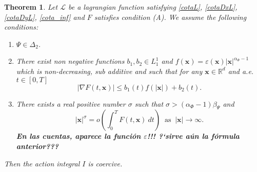 \documentclass[twoside]{article}
\newtheorem{thm}{Theorem}[section]
\theoremstyle{remark}
\renewcommand{\b}[1]{\boldsymbol{#1}}
\newcommand{\rr}{\mathbb{R}}
\renewcommand{\leq}{\leqslant}
\begin{document}
\begin{thm}\label{coercitividad-r}
Let  $\mathcal{L}$ be a lagrangian function satisfying \eqref{cotaL}, \eqref{cotaDxL}, \eqref{cotaDyL}, \eqref{cota_inf}  and $F$ satisfies condition (A). We assume the following conditions:
\begin{enumerate}
\item $\Psi\in\Delta_2$.
\item There exist  non negative functions  $b_1,b_2 \in L^1_1$ and 
$f(\b{x})=\varepsilon(\b{x})|\b{x}|^{\alpha_{\Phi}-1}$ which is  non-decreasing, sub additive and  such that
for any $\b{x}\in\rr^d$ and a.e. $t\in [0,T]$
\begin{equation}\label{holder_cont-mu}
  \left| \nabla F(t,\b{x}) \right|\leq b_1(t)f(|\b{x}|)+b_2(t).
\end{equation}
\item There exists a real positive number $\sigma$ such that $\sigma>(\alpha_{\Phi}-1)\beta_{\Psi}$ and
\begin{equation}\label{propiedad-coercividad-sigma}
|\b{x}|^{\sigma}=o\left(\int_{0}^{T}F(t,\b{x})\ dt\right)\;\;\mbox{as}\;\;|\b{x}|\to \infty.
\end{equation}
{\bf En las cuentas, aparece la funci\'on $\varepsilon$!!! 
?`sirve a\'un la f\'ormula anterior???}
\end{enumerate}
Then  the action integral $I$ is coercive.
\end{thm}
\end{document}
